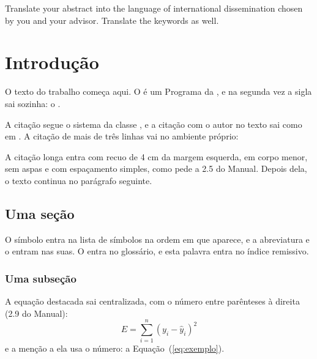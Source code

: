 \documentclass[dsc]{ufrj}
\begin{document}
  \begin{foreignabstract}
    Translate your abstract into the language of international dissemination
    chosen by you and your advisor. Translate the keywords as well.
  \end{foreignabstract}

  \listoffigures
  \listofquadros
  \listofprograms
  \listofalgorithms
  \listoftables
  \printloabbreviations
  \printlosiglas
  \printlosymbols
  \tableofcontents

  \mainmatter

  \chapter{Introdução}
  \label{cap:introducao}
  O texto do trabalho começa aqui. O  é um Programa da
  , e na segunda vez a sigla sai sozinha: o .

  A citação segue o sistema da classe \cite{m-4211}, e a citação com o autor
  no texto sai como em \textcite{m-4212}. A citação de mais de três linhas vai
  no ambiente próprio:

  \begin{longquote}
    A citação longa entra com recuo de 4 cm da margem esquerda, em corpo
    menor, sem aspas e com espaçamento simples, como pede a 2.5 do Manual.
    Depois dela, o texto continua no parágrafo seguinte.
  \end{longquote}

  \section{Uma seção}
  O símbolo  entra na lista de
  símbolos na ordem em que aparece, e a abreviatura 
  e o  entram nas suas. O
  entra no glossário, e esta palavra entra no índice
  remissivo.

  \subsection{Uma subseção}
  A equação destacada sai centralizada, com o número entre parênteses à
  direita (2.9 do Manual):
  \begin{equation}
    \label{eq:exemplo}
    E = \sum_{i=1}^{n} (y_i - \hat{y}_i)^2
  \end{equation}
  e a menção a ela usa o número: a Equação~(\ref{eq:exemplo}).
\end{document}
